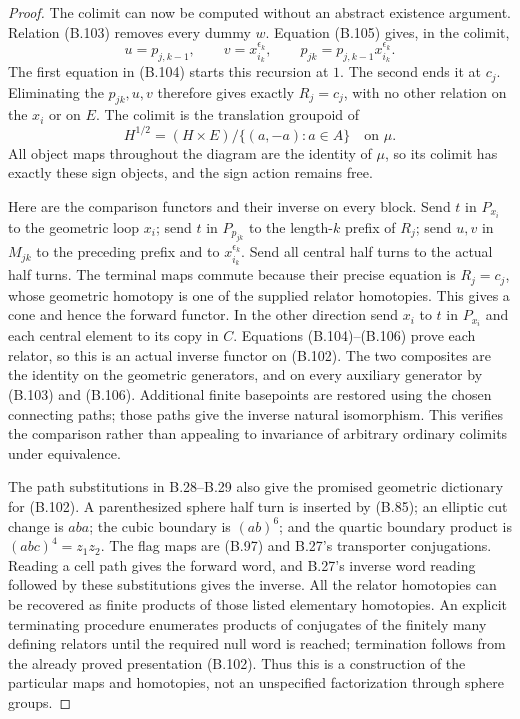 \begin{proof}
The colimit can now be computed without an abstract existence
argument.  Relation (B.103) removes every dummy $w$.
Equation (B.105) gives, in the colimit,
\[
 u=p_{j,k-1},\qquad v=x_{i_k}^{\epsilon_k},\qquad
 p_{jk}=p_{j,k-1}x_{i_k}^{\epsilon_k}.                          \tag{B.106}
\]
The first equation in (B.104) starts this recursion at $1$.
The second ends it at $c_j$.  Eliminating the $p_{jk},u,v$
therefore gives exactly $R_j=c_j$, with no other relation
on the $x_i$ or on $E$.  The colimit is the translation
groupoid of
\[
 H^{1/2}=(H\times E)/\{(a,-a):a\in A\}
          \quad\text{on }\mu.                                \tag{B.107}
\]
All object maps throughout the diagram are the identity of
$\mu$, so its colimit has exactly these sign objects, and
the sign action remains free.

Here are the comparison functors and their inverse on every
block.  Send $t$ in $P_{x_i}$ to the geometric loop $x_i$;
send $t$ in $P_{p_{jk}}$ to the length-$k$ prefix of $R_j$;
send $u,v$ in $M_{jk}$ to the preceding prefix and to
$x_{i_k}^{\epsilon_k}$.  Send all central half turns to the
actual half turns.  The terminal maps commute because their
precise equation is $R_j=c_j$, whose geometric homotopy is
one of the supplied relator homotopies.  This gives a cone
and hence the forward functor.  In the other direction send
$x_i$ to $t$ in $P_{x_i}$ and each central element to its
copy in $C$.  Equations (B.104)--(B.106) prove each relator,
so this is an actual inverse functor on (B.102).  The two
composites are the identity on the geometric generators,
and on every auxiliary generator by (B.103) and (B.106).
Additional finite basepoints are restored using the chosen
connecting paths; those paths give the inverse natural
isomorphism.  This verifies the comparison rather than
appealing to invariance of arbitrary ordinary colimits
under equivalence.

The path substitutions in B.28--B.29 also give the promised
geometric dictionary for (B.102).  A parenthesized sphere
half turn is inserted by (B.85); an elliptic cut change is
$aba$; the cubic boundary is $(ab)^6$; and the quartic
boundary product is $(abc)^4=z_1z_2$.  The flag maps are
(B.97) and B.27's transporter conjugations.  Reading a
cell path gives the forward word, and B.27's inverse word
reading followed by these substitutions gives the inverse.
All the relator homotopies can be recovered as finite
products of those listed elementary homotopies.  An
explicit terminating procedure enumerates products of
conjugates of the finitely many defining relators until
the required null word is reached; termination follows
from the already proved presentation (B.102).  Thus this
is a construction of the particular maps and homotopies,
not an unspecified factorization through sphere groups.


\end{proof}
